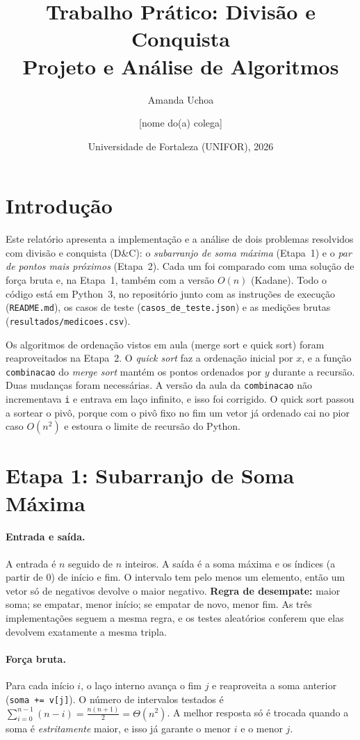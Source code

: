 \documentclass[11pt,a4paper]{article}
\title{Trabalho Prático: Divisão e Conquista\\\large Projeto e Análise de Algoritmos}
\author{Amanda Uchoa \and [nome do(a) colega]}
\date{Universidade de Fortaleza (UNIFOR), 2026}
\begin{document}
\renewcommand{\tablename}{Tabela}
\renewcommand{\figurename}{Figura}
\maketitle

\section{Introdução}

Este relatório apresenta a implementação e a análise de dois problemas resolvidos com divisão e conquista (D\&C): o \emph{subarranjo de soma máxima} (Etapa~1) e o \emph{par de pontos mais próximos} (Etapa~2). Cada um foi comparado com uma solução de força bruta e, na Etapa~1, também com a versão $O(n)$ (Kadane). Todo o código está em Python~3, no repositório junto com as instruções de execução (\texttt{README.md}), os casos de teste (\texttt{casos\_de\_teste.json}) e as medições brutas (\texttt{resultados/medicoes.csv}).

Os algoritmos de ordenação vistos em aula (merge sort e quick sort) foram reaproveitados na Etapa~2. O \emph{quick sort} faz a ordenação inicial por $x$, e a função \texttt{combinacao} do \emph{merge sort} mantém os pontos ordenados por $y$ durante a recursão. Duas mudanças foram necessárias. A versão da aula da \texttt{combinacao} não incrementava \texttt{i} e entrava em laço infinito, e isso foi corrigido. O quick sort passou a sortear o pivô, porque com o pivô fixo no fim um vetor já ordenado cai no pior caso $O(n^2)$ e estoura o limite de recursão do Python.

\section{Etapa 1: Subarranjo de Soma Máxima}

\paragraph{Entrada e saída.} A entrada é $n$ seguido de $n$ inteiros. A saída é a soma máxima e os índices (a partir de 0) de início e fim. O intervalo tem pelo menos um elemento, então um vetor só de negativos devolve o maior negativo. \textbf{Regra de desempate:} maior soma; se empatar, menor início; se empatar de novo, menor fim. As três implementações seguem a mesma regra, e os testes aleatórios conferem que elas devolvem exatamente a mesma tripla.

\paragraph{Força bruta.} Para cada início $i$, o laço interno avança o fim $j$ e reaproveita a soma anterior (\texttt{soma += v[j]}). O número de intervalos testados é
$\sum_{i=0}^{n-1}(n-i) = \frac{n(n+1)}{2} = \Theta(n^2)$.
A melhor resposta só é trocada quando a soma é \emph{estritamente} maior, e isso já garante o menor $i$ e o menor $j$.
\end{document}
